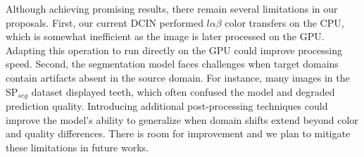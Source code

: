 Although achieving promising results, there remain several limitations in our proposals. 
First, our current DCIN performed $l\alpha \beta$ color transfers on the CPU, which is somewhat inefficient as the image is later processed on the GPU. 
Adapting this operation to run directly on the GPU could improve processing speed. 
Second, the segmentation model faces challenges when target domains contain artifacts absent in the source domain. 
For instance, many images in the $\mathrm{SP}_{seg}$ dataset displayed teeth, which often confused the model and degraded prediction quality. 
Introducing additional post-processing techniques could improve the model’s ability to generalize when domain shifts extend beyond color and quality differences. 
There is room for improvement and we plan to mitigate these limitations in future works. 